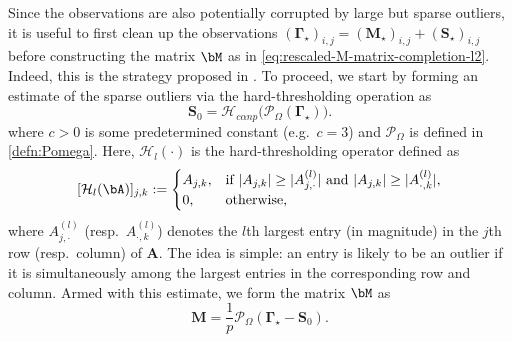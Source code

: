Since the observations are also potentially corrupted by large but sparse outliers, it is useful to first clean up the observations $(\bm{\Gamma}_{\star})_{i,j} = (\bm{M}_{\star})_{i,j} + (\bm{S}_{\star})_{i,j}$ before constructing the matrix $\bM$ as in \eqref{eq:rescaled-M-matrix-completion-l2}. Indeed, this is the strategy proposed in \cite{yi2016fast}. 
To proceed, we start by forming an estimate of the sparse outliers via the hard-thresholding operation as
\begin{equation}\label{eq:hard_threshodling_init}
\bm{S}_{0}=\mathcal{H}_{c\alpha np}\big(\mathcal{P}_{\Omega}(\bm{\Gamma}_{\star} )\big).
\end{equation}
where $c>0$ is some predetermined constant (e.g.~$c=3$) and $\mathcal{P}_{\Omega}$ is defined in \eqref{defn:Pomega}. Here, $\mathcal{H}_l(\cdot)$ is the hard-thresholding operator defined as
%
\[
	[\mathcal{H}_{l}(\bA)]_{j,k} := \begin{cases}  A_{j,k},  &\text{if }|A_{j,k}|\geq |A_{j,\cdot}^{(l)}| \text{ and }
							|A_{j,k}|\geq |A_{\cdot,k}^{(l)}|,  \\
							0, & \text{otherwise,}
					  \end{cases}
\]
where 
$A_{j,\cdot}^{(l)}$ (resp.~$A_{\cdot,k}^{(l)}$) denotes the $l$th largest entry (in magnitude) in the $j$th row (resp.~column) of $\bm{A}$.
The  idea is simple: an entry is likely to be an outlier if it is simultaneously among the largest entries in the corresponding row and column. Armed with this estimate, we form the matrix $\bM$ as
%
\begin{equation}
	\label{eq:Y-RPCA}
	\bm{M} =\frac{1}{p} \mathcal{P}_{\Omega}(\bm{\Gamma}_{\star}   - \bm{S}_{0}).
\end{equation}

 
%	


